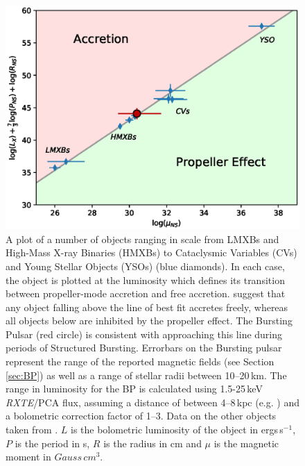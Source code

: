 \begin{figure}
  \centering
  \includegraphics[width=.9\linewidth, trim={0.6cm 0.1cm 1.0cm 1cm},clip]{images/propeff.eps}
  \caption{\small  A plot of a number of objects ranging in scale from LMXBs and High-Mass X-ray Binaries (HMXBs) to Cataclysmic Variables (CVs) and Young Stellar Objects (YSOs) (blue diamonds).  In each case, the object is plotted at the luminosity which defines its transition between propeller-mode accretion and free accretion.  \citealp{Campana_PropBorder} suggest that any object falling above the line of best fit accretes freely, whereas all objects below are inhibited by the propeller effect.  The Bursting Pulsar (red circle) is consistent with approaching this line during periods of Structured Bursting.  Errorbars on the Bursting pulsar represent the range of the reported magnetic fields (see Section \ref{sec:BP}) as well as a range of stellar radii between 10--20\,km.  The range in luminosity for the BP is calculated using 1.5-25\,keV \textit{RXTE}/PCA flux, assuming a distance of between 4--8\,kpc (e.g. \citealp{Kouveliotou_BP,Gosling_BPCompanion,Sanna_BP}) and a bolometric correction factor of 1--3.   Data on the other objects taken from \citealp{Campana_PropBorder}.  $L$ is the bolometric luminosity of the object in ergs\,s$^{-1}$, $P$ is the period in s, $R$ is the radius in cm and $\mu$ is the magnetic moment in $Gauss\,cm^3$.}
  \label{fig:propBorder}
\end{figure}

